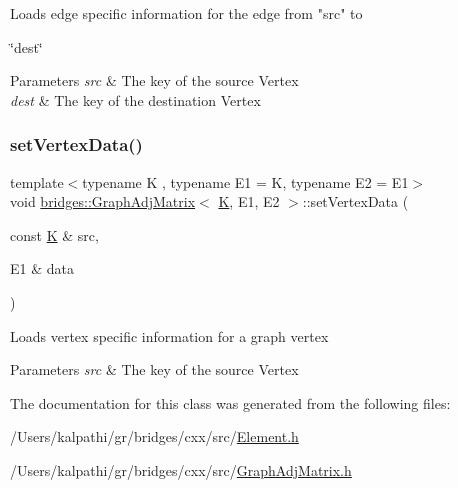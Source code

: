\begin{DoxyVerb}Loads edge specific information for the edge from "src" to
\end{DoxyVerb}
 \char`\"{}dest\char`\"{}


\begin{DoxyParams}{Parameters}
{\em src} & The key of the source Vertex \\
\hline
{\em dest} & The key of the destination Vertex \\
\hline
\end{DoxyParams}
\mbox{\label{classbridges_1_1_graph_adj_matrix_a0dcc7220d850052aea47fccfd52192e0}} 
\subsubsection{\texorpdfstring{setVertexData()}{setVertexData()}}
{\footnotesize\ttfamily template$<$typename K , typename E1  = K, typename E2  = E1$>$ \\
void \mbox{\hyperlink{classbridges_1_1_graph_adj_matrix}{bridges\+::\+Graph\+Adj\+Matrix}}$<$ \mbox{\hyperlink{namespacebridges_acfb0a4f7877d8f63de3e6862004c50edaa5f3c6a11b03839d46af9fb43c97c188}{K}}, E1, E2 $>$\+::set\+Vertex\+Data (\begin{DoxyParamCaption}\item[{const \mbox{\hyperlink{namespacebridges_acfb0a4f7877d8f63de3e6862004c50edaa5f3c6a11b03839d46af9fb43c97c188}{K}} \&}]{src,  }\item[{E1 \&}]{data }\end{DoxyParamCaption})\hspace{0.3cm}{\ttfamily [inline]}}

\begin{DoxyVerb}Loads vertex specific information for a graph vertex
\end{DoxyVerb}



\begin{DoxyParams}{Parameters}
{\em src} & The key of the source Vertex \\
\hline
\end{DoxyParams}


The documentation for this class was generated from the following files\+:\begin{DoxyCompactItemize}
\item 
/\+Users/kalpathi/gr/bridges/cxx/src/\mbox{\hyperlink{_element_8h}{Element.\+h}}\item 
/\+Users/kalpathi/gr/bridges/cxx/src/\mbox{\hyperlink{_graph_adj_matrix_8h}{Graph\+Adj\+Matrix.\+h}}\end{DoxyCompactItemize}
